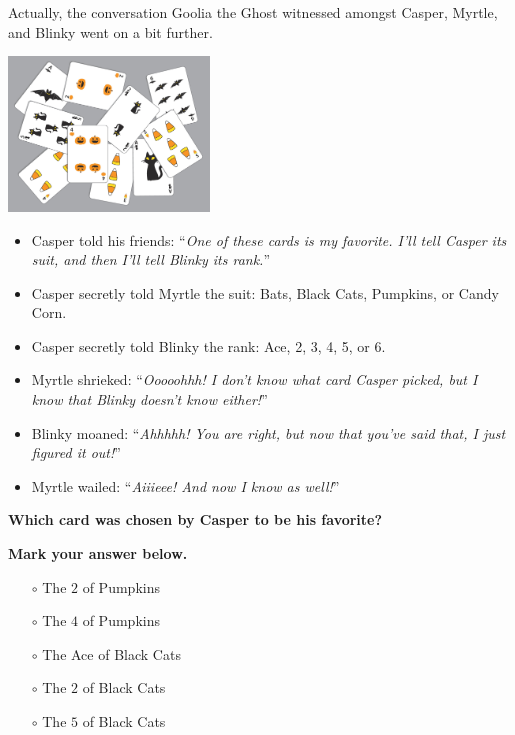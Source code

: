 


Actually, the conversation Goolia the Ghost witnessed amongst
Casper, Myrtle, and Blinky went on a bit further.

\begin{center}
    \includegraphics[width=0.4\textwidth]{assets/kat/cardstogeth}
\end{center}

\begin{itemize}
  \item Casper told his friends:
        ``\textit{One of these cards is my favorite. I'll tell Casper
        its suit, and then I'll tell Blinky its rank.}''
  \item Casper secretly told Myrtle the suit:
        Bats, Black Cats, Pumpkins, or Candy Corn.
  \item Casper secretly told Blinky the rank:
        Ace, 2, 3, 4, 5, or 6.
  \item Myrtle shrieked:
        ``\textit{Ooooohhh! I don't know what card Casper picked, but I know
        that Blinky doesn't know either!}''
  \item Blinky moaned:
        ``\textit{Ahhhhh! You are right, but now that you've said that,
        I just figured it out!}''
  \item Myrtle wailed:
        ``\textit{Aiiieee! And now I know as well!}''
\end{itemize}

\textbf{Which card was chosen by Casper to be his favorite?}

\vspace{2em}

\textbf{Mark your answer below.}

\begin{itemize}
  \item[\Huge\(\circ\)] The \(2\) of Pumpkins
  \item[\Huge\(\circ\)] The \(4\) of Pumpkins
  \item[\Huge\(\circ\)] The Ace of Black Cats
  \item[\Huge\(\circ\)] The \(2\) of Black Cats
  \item[\Huge\(\circ\)] The \(5\) of Black Cats
\end{itemize}
